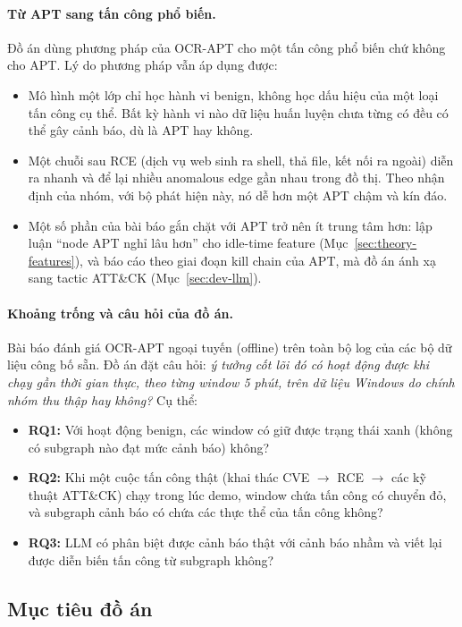 \paragraph{Từ APT sang tấn công phổ biến.}
Đồ án dùng phương pháp của OCR-APT cho một tấn công phổ biến chứ không cho APT. Lý do phương pháp vẫn áp dụng được:
\begin{itemize}
    \item Mô hình một lớp chỉ học hành vi benign, không học dấu hiệu của một loại tấn công cụ thể. Bất kỳ hành vi nào dữ liệu huấn luyện chưa từng có đều có thể gây cảnh báo, dù là APT hay không.
    \item Một chuỗi sau RCE (dịch vụ web sinh ra shell, thả file, kết nối ra ngoài) diễn ra nhanh và để lại nhiều anomalous edge gần nhau trong đồ thị. Theo nhận định của nhóm, với bộ phát hiện này, nó dễ hơn một APT chậm và kín đáo.
    \item Một số phần của bài báo gắn chặt với APT trở nên ít trung tâm hơn: lập luận ``node APT nghỉ lâu hơn'' cho idle-time feature (Mục~\ref{sec:theory-features}), và báo cáo theo giai đoạn kill chain của APT, mà đồ án ánh xạ sang tactic ATT\&CK (Mục~\ref{sec:dev-llm}).
\end{itemize}

\paragraph{Khoảng trống và câu hỏi của đồ án.}
Bài báo đánh giá OCR-APT ngoại tuyến (offline) trên toàn bộ log của các bộ dữ liệu công bố sẵn. Đồ án đặt câu hỏi: \emph{ý tưởng cốt lõi đó có hoạt động được khi chạy gần thời gian thực, theo từng window 5 phút, trên dữ liệu Windows do chính nhóm thu thập hay không?} Cụ thể:
\begin{itemize}
    \item \textbf{RQ1:} Với hoạt động benign, các window có giữ được trạng thái xanh (không có subgraph nào đạt mức cảnh báo) không?
    \item \textbf{RQ2:} Khi một cuộc tấn công thật (khai thác CVE $\rightarrow$ RCE $\rightarrow$ các kỹ thuật ATT\&CK) chạy trong lúc demo, window chứa tấn công có chuyển đỏ, và subgraph cảnh báo có chứa các thực thể của tấn công không?
    \item \textbf{RQ3:} LLM có phân biệt được cảnh báo thật với cảnh báo nhầm và viết lại được diễn biến tấn công từ subgraph không?
\end{itemize}

\subsection{Mục tiêu đồ án}
\label{sec:goals}

